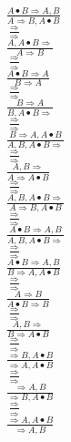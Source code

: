 \documentclass[11pt]{article}
\begin{document}
\begin{center}
\\$\frac{A\bullet B\Rightarrow A, B}{A\Rightarrow B, A\bullet B}$
\bigskip
\\$\frac{\Rightarrow }{\Rightarrow }$
\bigskip
\\$\frac{A, A\bullet B\Rightarrow }{A\Rightarrow B}$
\bigskip
\\$\frac{\Rightarrow }{\Rightarrow }$
\bigskip
\\$\frac{A\bullet B\Rightarrow A}{B\Rightarrow A}$
\bigskip
\\$\frac{\Rightarrow }{\Rightarrow }$
\bigskip
\\$\frac{B\Rightarrow A}{B, A\bullet B\Rightarrow }$
\bigskip
\\$\frac{\Rightarrow }{\Rightarrow }$
\bigskip
\\$\frac{B\Rightarrow A, A\bullet B}{A, B, A\bullet B\Rightarrow }$
\bigskip
\\$\frac{\Rightarrow }{\Rightarrow }$
\bigskip
\\$\frac{A, B\Rightarrow }{A\Rightarrow A\bullet B}$
\bigskip
\\$\frac{\Rightarrow }{\Rightarrow }$
\bigskip
\\$\frac{A, B, A\bullet B\Rightarrow }{A\Rightarrow B, A\bullet B}$
\bigskip
\\$\frac{\Rightarrow }{\Rightarrow }$
\bigskip
\\$\frac{A\bullet B\Rightarrow A, B}{A, B, A\bullet B\Rightarrow }$
\bigskip
\\$\frac{\Rightarrow }{\Rightarrow }$
\bigskip
\\$\frac{A\bullet B\Rightarrow A, B}{B\Rightarrow A, A\bullet B}$
\bigskip
\\$\frac{\Rightarrow }{\Rightarrow }$
\bigskip
\\$\frac{A\Rightarrow B}{A\bullet B\Rightarrow B}$
\bigskip
\\$\frac{\Rightarrow }{\Rightarrow }$
\bigskip
\\$\frac{A, B\Rightarrow }{B\Rightarrow A\bullet B}$
\bigskip
\\$\frac{\Rightarrow }{\Rightarrow }$
\bigskip
\\$\frac{\Rightarrow B, A\bullet B}{\Rightarrow A, A\bullet B}$
\bigskip
\\$\frac{\Rightarrow }{\Rightarrow }$
\bigskip
\\$\frac{\Rightarrow A, B}{\Rightarrow B, A\bullet B}$
\bigskip
\\$\frac{\Rightarrow }{\Rightarrow }$
\bigskip
\\$\frac{\Rightarrow A, A\bullet B}{\Rightarrow A, B}$

\end{center}
\end{document}
